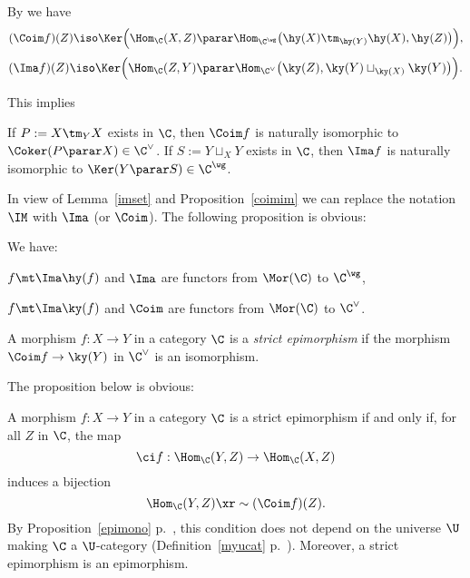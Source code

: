 \documentclass[12pt]{article}
\theoremstyle{remark}
\theoremstyle{definition}
\begin{document}
By  we have 
$$ 
(\Coim f)(Z)\iso\Ker\Big(\Hom_\C(X,Z)\parar\Hom_{\C^\wg}\big(\hy(X)\tm_{\hy(Y)}\hy(X),\hy(Z)\big)\Big), 
$$ 
$$ 
(\Ima f)(Z)\iso\Ker\Big(\Hom_\C(Z,Y)\parar\Hom_{\C^\vee}\big(\ky(Z),\ky(Y)\sqcup_{\ky(X)}\ky(Y)\big)\Big). 
$$
 
This implies 

\begin{prop}
If $P:=X\tm_YX$ exists in $\C$, then $\Coim f$ is naturally isomorphic to $\Coker(P\parar X)\in\C^\vee$. If $S:=Y\sqcup_XY$ exists in $\C$, then $\Ima f$ is naturally isomorphic to $\Ker(Y\parar S)\in\C^\wg$. 
\end{prop} 

In view of Lemma~\ref{imset} and Proposition~\ref{coimim} we can replace the notation $\IM$ with $\Ima$ (or $\Coim$). The following proposition is obvious: 

\begin{prop}
We have: 

$f\mt\Ima\hy(f)$ and $\Ima$ are functors from $\Mor(\C)$ to $\C^\wg$, 

$f\mt\Ima\ky(f)$ and $\Coim$ are functors from $\Mor(\C)$ to $\C^\vee$. 
\end{prop}

\begin{df} 
A morphism $f:X\to Y$ in a category $\C$ is a {\em strict epimorphism} if the morphism $\Coim f\to\ky(Y)$ in $\C^\vee$ is an isomorphism.
\end{df} 

The proposition below is obvious:

\begin{prop}
A morphism $f:X\to Y$ in a category $\C$ is a strict epimorphism if and only if, for all $Z$ in $\C$, the map 
$$
\ci f:\Hom_\C(Y,Z)\to\Hom_\C(X,Z)
$$ 
induces a bijection 
$$
\Hom_\C(Y,Z)\xr\sim(\Coim f)(Z).
$$ 
By Proposition~\ref{epimono} p.~, this condition does not depend on the universe $\U$ making $\C$ a $\U$-category (Definition~\ref{myucat} p.~). Moreover, a strict epimorphism is an epimorphism. 
\end{prop}


\end{document}
